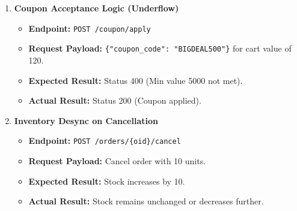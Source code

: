 \documentclass{article}
\begin{document}
\begin{enumerate}
    \item \textbf{Coupon Acceptance Logic (Underflow)}
    \begin{itemize}
        \item \textbf{Endpoint:} \texttt{POST /coupon/apply}
        \item \textbf{Request Payload:} \texttt{\{"coupon_code": "BIGDEAL500"\}} for cart value of 120.
        \item \textbf{Expected Result:} Status 400 (Min value 5000 not met).
        \item \textbf{Actual Result:} Status 200 (Coupon applied).
    \end{itemize}

    \item \textbf{Inventory Desync on Cancellation}
    \begin{itemize}
        \item \textbf{Endpoint:} \texttt{POST /orders/\{oid\}/cancel}
        \item \textbf{Request Payload:} Cancel order with 10 units.
        \item \textbf{Expected Result:} Stock increases by 10.
        \item \textbf{Actual Result:} Stock remains unchanged or decreases further.
    \end{itemize}
\end{enumerate}
\end{document}
